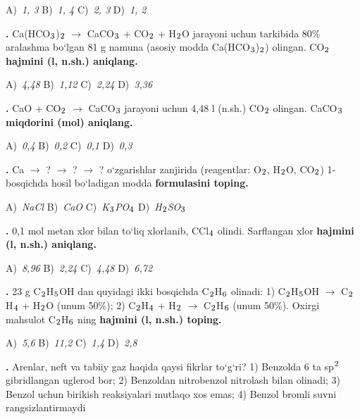 \documentclass[11pt,a4paper]{article}
\renewcommand{\textsubscript}[1]{\ensuremath{_{\text{\fontsize{8}{8}\selectfont #1}}}}
\renewcommand{\textsuperscript}[1]{\ensuremath{^{\text{\fontsize{8}{8}\selectfont #1}}}}
\newcommand{\qn}[1]{\textbf{\fontsize{11.5}{13}\selectfont #1}}
\newcommand{\qsep}{\par\vspace{1pt}\noindent\rule{0pt}{0.4pt}\par\vspace{5pt}}
\begin{document}
\begin{multicols}{2}
\noindent A)~\textsl{1, 3} \hfill B)~\textsl{1, 4} \hfill C)~\textsl{2, 3} \hfill D)~\textsl{1, 2}\par
\qsep
\noindent\qn{17.} Ca(HCO\textsubscript{3})\textsubscript{2} $\to$ CaCO\textsubscript{3} + CO\textsubscript{2} + H\textsubscript{2}O jarayoni uchun tarkibida 80\% aralashma bo`lgan 81 g namuna (asosiy modda Ca(HCO\textsubscript{3})\textsubscript{2}) olingan. CO\textsubscript{2} \textbf{hajmini (l, n.sh.) aniqlang.}

\noindent A)~\textsl{4,48} \hfill B)~\textsl{1,12} \hfill C)~\textsl{2,24} \hfill D)~\textsl{3,36}\par
\qsep
\noindent\qn{18.} CaO + CO\textsubscript{2} $\to$ CaCO\textsubscript{3} jarayoni uchun 4,48 l (n.sh.) CO\textsubscript{2} olingan. CaCO\textsubscript{3} \textbf{miqdorini (mol) aniqlang.}

\noindent A)~\textsl{0,4} \hfill B)~\textsl{0,2} \hfill C)~\textsl{0,1} \hfill D)~\textsl{0,3}\par
\qsep
\noindent\qn{19.} Ca $\to$ ? $\to$ ? $\to$ ? o`zgarishlar zanjirida (reagentlar: O\textsubscript{2}, H\textsubscript{2}O, CO\textsubscript{2}) 1-bosqichda hosil bo`ladigan modda \textbf{formulasini toping.}

\noindent A)~\textsl{NaCl} \hfill B)~\textsl{CaO} \hfill C)~\textsl{K\textsubscript{3}PO\textsubscript{4}} \hfill D)~\textsl{H\textsubscript{2}SO\textsubscript{3}}\par
\qsep
\noindent\qn{20.} 0,1 mol metan xlor bilan to`liq xlorlanib, CCl\textsubscript{4} olindi. Sarflangan xlor \textbf{hajmini (l, n.sh.) aniqlang.}

\noindent A)~\textsl{8,96} \hfill B)~\textsl{2,24} \hfill C)~\textsl{4,48} \hfill D)~\textsl{6,72}\par
\qsep
\noindent\qn{21.} 23 g C\textsubscript{2}H\textsubscript{5}OH dan quyidagi ikki bosqichda C\textsubscript{2}H\textsubscript{6} olinadi: 1) C\textsubscript{2}H\textsubscript{5}OH $\to$ C\textsubscript{2}H\textsubscript{4} + H\textsubscript{2}O (unum 50\%); 2) C\textsubscript{2}H\textsubscript{4} + H\textsubscript{2} $\to$ C\textsubscript{2}H\textsubscript{6} (unum 50\%). Oxirgi mahsulot C\textsubscript{2}H\textsubscript{6} ning \textbf{hajmini (l, n.sh.) toping.}

\noindent A)~\textsl{5,6} \hfill B)~\textsl{11,2} \hfill C)~\textsl{1,4} \hfill D)~\textsl{2,8}\par
\qsep
\noindent\qn{22.} Arenlar, neft va tabiiy gaz haqida qaysi fikrlar to`g`ri? 1) Benzolda 6 ta sp\textsuperscript{2} gibridlangan uglerod bor; 2) Benzoldan nitrobenzol nitrolash bilan olinadi; 3) Benzol uchun birikish reaksiyalari mutlaqo xos emas; 4) Benzol bromli suvni rangsizlantirmaydi


\end{multicols}
\end{document}
